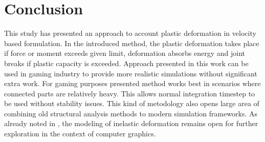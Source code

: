 \section{Conclusion}

This study has presented an approach to account plastic deformation in 
velocity based formulation.
In the introduced method, the plastic deformation takes place if force or moment exceeds given 
limit, deformation absorbs energy and joint breaks if plastic capacity is exceeded. 
Approach presented in this work can be used in gaming industry to provide more realistic 
simulations without significant extra work. 
For gaming purposes presented method works 
best in scenarios where connected parts are relatively heavy. This allows normal 
integration timestep to be used without stability issues. 
This kind of metodology also opens large area of combining old structural analysis
methods to modern simulation frameworks.
As already noted in \cite{cg1988}, the modeling of inelastic deformation
remains open for further exploration in the context of computer graphics.

